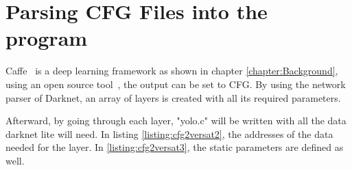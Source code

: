



\section{Parsing CFG Files into the program}

Caffe~\cite{caffe} is a deep learning framework as shown in chapter \ref{chapter:Background}, using an open source tool~\cite{caffe2darknet}, the output can be set to CFG.
By using the network parser of Darknet, an array of layers is created with all its required parameters. 



Afterward, by going through each layer, "yolo.c" will be written with all the data darknet lite will need. 
In listing \ref{listing:cfg2versat2}, the addresses of the data needed for the layer. 
In \ref{listing:cfg2versat3}, the static parameters are defined as well.




